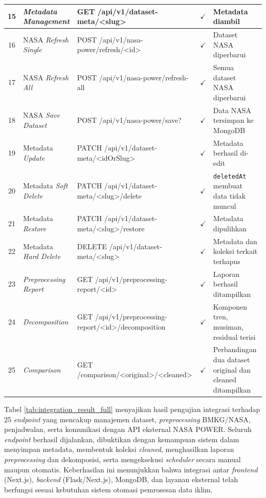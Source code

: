 \begin{longtable}{|c|p{2.5cm}|>{\raggedright\arraybackslash}p{5.5cm}|c|p{3.5cm}|}
                \hline
                15 & \textit{Metadata Management} & GET /api/v1/dataset-meta/<slug> & $\checkmark$ & Metadata diambil \\
                \hline
                16 & NASA \textit{Refresh Single} & POST /api/v1/nasa-power/refresh/<id> & $\checkmark$ & Dataset NASA diperbarui \\
                \hline
                17 & NASA \textit{Refresh All} & POST /api/v1/nasa-power/refresh-all & $\checkmark$ & Semua dataset NASA diperbarui \\
                \hline
                18 & NASA \textit{Save Dataset} & POST /api/v1/nasa-power/save? & $\checkmark$ & Data NASA tersimpan ke MongoDB \\
                \hline
                19 & Metadata \textit{Update} & PATCH /api/v1/dataset-meta/<idOrSlug> & $\checkmark$ & Metadata berhasil di-edit \\
                \hline
                20 & Metadata \textit{Soft Delete} & PATCH /api/v1/dataset-meta/<slug>/delete & $\checkmark$ & \texttt{deletedAt} membuat data tidak muncul \\
                \hline
                21 & Metadata \textit{Restore} & PATCH /api/v1/dataset-meta/<slug>/restore & $\checkmark$ & Metadata dipulihkan \\
                \hline
                22 & Metadata \textit{Hard Delete} & DELETE /api/v1/dataset-meta/<slug> & $\checkmark$ & Metadata dan koleksi terkait terhapus \\
                \hline
                23 & \textit{Preprocessing Report} & GET /api/v1/preprocessing-report/<id> & $\checkmark$ & Laporan berhasil ditampilkan \\
                \hline
                24 & \textit{Decomposition} & GET /api/v1/preprocessing-report/<id>/decomposition & $\checkmark$ & Komponen tren, musiman, residual terisi \\
                \hline
                25 & \textit{Comparison} & GET /comparison/<original>/<cleaned> & $\checkmark$ & Perbandingan dua dataset original dan cleaned ditampilkan \\
                \hline
        \end{longtable}
        Tabel \ref{tab:integration_result_full} menyajikan hasil pengujian integrasi terhadap 25 \textit{endpoint} yang mencakup manajemen dataset, \textit{preprocessing} BMKG/NASA, penjadwalan, serta komunikasi dengan API eksternal NASA POWER. Seluruh \textit{endpoint} berhasil dijalankan, dibuktikan dengan kemampuan sistem dalam menyimpan metadata, membentuk koleksi \textit{cleaned}, menghasilkan laporan \textit{preprocessing} dan dekomposisi, serta mengeksekusi \textit{scheduler} secara manual maupun otomatis. Keberhasilan ini menunjukkan bahwa integrasi antar \textit{frontend} (Next.js), \textit{backend} (Flask/Next.js), MongoDB, dan layanan eksternal telah berfungsi sesuai kebutuhan sistem otomasi pemrosesan data iklim.

